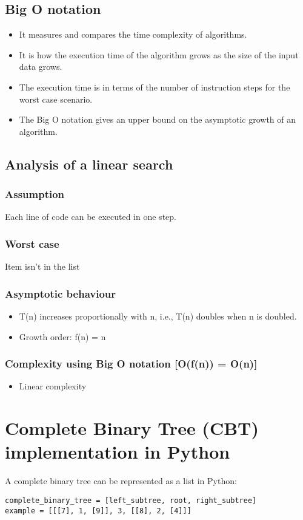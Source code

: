 \documentclass[11pt]{article}
\begin{document}
\subsection{Big O notation}
\label{sec:org5b2c774}
\begin{itemize}
\item It measures and compares the time complexity of algorithms.
\item It is how the execution time of the algorithm grows as the size of the input data grows.
\item The execution time is in terms of the number of instruction steps for the worst case scenario.
\item The Big O notation gives an upper bound on the asymptotic growth of an algorithm.
\end{itemize}
\subsection{Analysis of a linear search}
\label{sec:org383e066}

\subsubsection{Assumption}
\label{sec:orgf4ae144}
Each line of code can be executed in one step.
\subsubsection{Worst case}
\label{sec:org6f0d159}
Item isn't in the list
\subsubsection{Asymptotic behaviour}
\label{sec:orgfe5c832}
\begin{itemize}
\item T(n) increases proportionally with n, i.e., T(n) doubles when n is doubled.
\item Growth order: f(n) = n
\end{itemize}
\subsubsection{Complexity using Big O notation [O(f(n)) = O(n)]}
\label{sec:orga8f5894}
\begin{itemize}
\item Linear complexity
\end{itemize}
\section{Complete Binary Tree (CBT) implementation in Python}
\label{sec:org113a5bb}
A complete binary tree can be represented as a list in Python:
\begin{verbatim}
complete_binary_tree = [left_subtree, root, right_subtree]
example = [[[7], 1, [9]], 3, [[8], 2, [4]]]
\end{verbatim}
\end{document}
